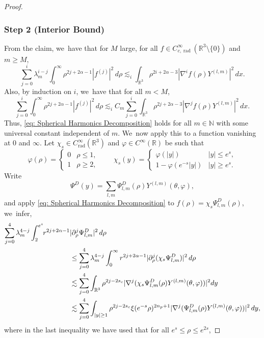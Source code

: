 \documentclass[JEP,XML,SOM,Unicode]{cedram}
\theoremstyle{plain}
\theoremstyle{definition}
\DeclareMathOperator{\rad}{rad}
\begin{document}
\begin{proof}
\subsubsection*{Step 2 (Interior Bound)}
From the claim, we~have that for $M$ large, for all $f\in C_{c,\rad}^\infty(\mathbb R^3\setminus \{0\})$ and $m\ge M$,
\[
\sum_{j=0}^i\lambda_m^{i-j}\int_0^\infty \rho^{2j+2\alpha-1}|f^{(j)}|^2\,d\rho\lesssim_i \int_{\mathbb R^3}\rho^{2i+2\alpha-3}|\nabla^i f(\rho)Y^{(l,m)}|^2\,dx.
\]
Also, by induction on $i$, we~have that for all $m<M$,
\begin{equation}
\label{eq: Spherical Harmonics Decomposition}
\sum_{j=0}^i\int_0^\infty \rho^{2j+2\alpha-1}|f^{(j)}|^2\,d\rho\lesssim_i C_m\sum_{j=0}^i\int_{\mathbb R^3}\rho^{2j+2\alpha-3}|\nabla^j f(\rho)Y^{(l,m)}|^2\,dx.
\end{equation}
Thus, \eqref{eq: Spherical Harmonics Decomposition} holds for all $m\in \mathbb N$ with some universal constant independent of $m$. We~now apply this to a function vanishing at $0$ and $\infty$. Let $\chi_s\in C^\infty_{\rad}(\mathbb R^3)$ and $\varphi\in C^\infty(\mathbb R)$ be such that
\[
\varphi(\rho)=
\begin{cases}
0 & \rho\le 1,\\ 1 & \rho\ge 2,
\end{cases}\qquad
\chi_s(y)=\begin{cases}
\varphi(|y|) & |y| \le e^s,\\
1-\varphi(e^{-s}|y|)& |y|\ge e^s.
\end{cases}
\]
Write
\[
\Psi^D(y)=\sum_{l,m} \Psi_{l,m}^D(\rho) Y^{(l,m)}(\theta,\varphi),
\]
and apply \eqref{eq: Spherical Harmonics Decomposition} to $f(\rho)=\chi_s\Psi_{l,m}^D(\rho)$, we~infer,
\[
\begin{aligned}
\sum_{j=0}^{4}\lambda_m^{4-j}\int_2^{e^s}\hspace*{-1mm} r^{2j+2\alpha-1}&|\partial_\rho^j \Psi_{l,m}^D|^2\,d\rho\\
&\le \sum_{j=0}^{4}\lambda_m^{4-j}\int_0^\infty r^{2j+2\alpha-1}|\partial_\rho^j(\chi_s \Psi_{l,m}^D)|^2\,d\rho\\
&\lesssim \sum_{j=0}^4\int_{\mathbb R^3} \rho^{2j-2s_c}|\nabla^j(\chi_s\Psi_{l,m}^D(\rho)Y^{(l,m)}(\theta,\varphi))|^2dy\\
&\lesssim \sum_{j=0}^4\int_{|y|\ge1}\rho^{2j-2s_c}\xi(e^{-s}\rho)^{2n_p+1}|\nabla^j(\Psi_{l,m}^D(\rho)Y^{(l,m)}(\theta,\varphi))|^2\,dy,
\end{aligned}
\]
where in the last inequality we have used that for all $e^s\le \rho\le e^{2s}$,

\end{proof}
\end{document}
